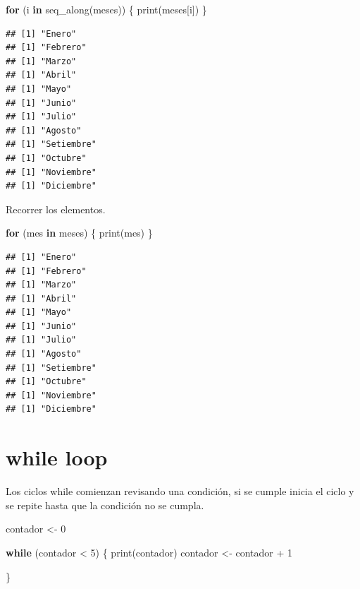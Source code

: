 \documentclass[
  12pt,
]{book}
\newenvironment{Shaded}{\begin{snugshade}}{\end{snugshade}}
\newcommand{\ControlFlowTok}[1]{\textcolor[rgb]{0.13,0.29,0.53}{\textbf{#1}}}
\newcommand{\DecValTok}[1]{\textcolor[rgb]{0.00,0.00,0.81}{#1}}
\newcommand{\FunctionTok}[1]{\textcolor[rgb]{0.00,0.00,0.00}{#1}}
\newcommand{\NormalTok}[1]{#1}
\newcommand{\OtherTok}[1]{\textcolor[rgb]{0.56,0.35,0.01}{#1}}
\newcommand{\SpecialCharTok}[1]{\textcolor[rgb]{0.00,0.00,0.00}{#1}}
\begin{document}
\begin{Shaded}
\begin{Highlighting}[]
\ControlFlowTok{for}\NormalTok{ (i }\ControlFlowTok{in} \FunctionTok{seq\_along}\NormalTok{(meses)) \{}
  \FunctionTok{print}\NormalTok{(meses[i])}
\NormalTok{\}}
\end{Highlighting}
\end{Shaded}

\begin{verbatim}
## [1] "Enero"
## [1] "Febrero"
## [1] "Marzo"
## [1] "Abril"
## [1] "Mayo"
## [1] "Junio"
## [1] "Julio"
## [1] "Agosto"
## [1] "Setiembre"
## [1] "Octubre"
## [1] "Noviembre"
## [1] "Diciembre"
\end{verbatim}

Recorrer los elementos.

\begin{Shaded}
\begin{Highlighting}[]
\ControlFlowTok{for}\NormalTok{ (mes }\ControlFlowTok{in}\NormalTok{ meses) \{}
  \FunctionTok{print}\NormalTok{(mes)}
\NormalTok{\}}
\end{Highlighting}
\end{Shaded}

\begin{verbatim}
## [1] "Enero"
## [1] "Febrero"
## [1] "Marzo"
## [1] "Abril"
## [1] "Mayo"
## [1] "Junio"
## [1] "Julio"
## [1] "Agosto"
## [1] "Setiembre"
## [1] "Octubre"
## [1] "Noviembre"
## [1] "Diciembre"
\end{verbatim}

\hypertarget{while-loop}{%
\section{\texorpdfstring{\textbf{while loop}}{while loop}}\label{while-loop}}

Los ciclos while comienzan revisando una condición, si se cumple inicia el ciclo y se repite hasta que la condición no se cumpla.

\begin{Shaded}
\begin{Highlighting}[]
\NormalTok{contador }\OtherTok{\textless{}{-}} \DecValTok{0}

\ControlFlowTok{while}\NormalTok{ (contador }\SpecialCharTok{\textless{}} \DecValTok{5}\NormalTok{) \{}
  \FunctionTok{print}\NormalTok{(contador)}
\NormalTok{  contador }\OtherTok{\textless{}{-}}\NormalTok{ contador }\SpecialCharTok{+} \DecValTok{1}

\NormalTok{\}}
\end{Highlighting}
\end{Shaded}
\end{document}
